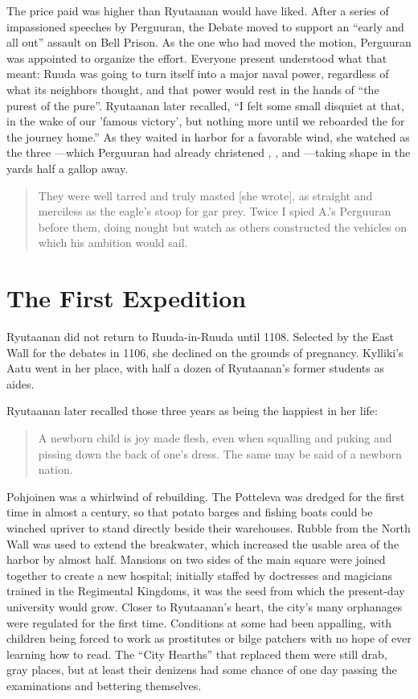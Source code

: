 \documentclass[12pt]{report}
\begin{document}
The price paid was higher than Ryutaanan would have liked.  After a
series of impassioned speeches by Perguuran, the Debate moved to
support an ``early and all out'' assault on Bell Prison.  As the one who
had moved the motion, Perguuran was appointed to organize the effort.
Everyone present understood what that meant: Ruuda was going to turn
itself into a major naval power, regardless of what its neighbors
thought, and that power would rest in the hands of ``the purest of the
pure''.  Ryutaanan later recalled, ``I felt some small disquiet at that,
in the wake of our 'famous victory', but nothing more until we
reboarded the  for the journey home.''  As they waited in
harbor for a favorable wind, she watched as the three
---which Perguuran had already christened , , and ---taking shape in the yards half a gallop away.

\begin{quotation}
They were well tarred and truly masted [she wrote], as straight and
merciless as the eagle's stoop for gar prey.  Twice I spied A.'s
Perguuran before them, doing nought but watch as others constructed
the vehicles on which his ambition would sail.
\end{quotation}

\chapter{The First Expedition}

Ryutaanan did not return to Ruuda-in-Ruuda until 1108.  Selected by
the East Wall  for the debates in 1106, she declined on
the grounds of pregnancy.  Kylliki's Aatu went in her place, with half
a dozen of Ryutaanan's former students as aides.

Ryutaanan later recalled those three years as being the happiest in
her life:

\begin{quotation}
A newborn child is joy made flesh, even when squalling and puking and
pissing down the back of one's dress.  The same may be said of a
newborn nation.
\end{quotation}

Pohjoinen was a whirlwind of rebuilding.  The Potteleva was dredged
for the first time in almost a century, so that potato barges and
fishing boats could be winched upriver to stand directly beside their
warehouses.  Rubble from the North Wall was used to extend the
breakwater, which increased the usable area of the harbor by almost
half.  Mansions on two sides of the main square were joined together
to create a new hospital; initially staffed by doctresses and
magicians trained in the Regimental Kingdoms, it was the seed from
which the present-day university would grow.  Closer to Ryutaanan's
heart, the city's many orphanages were regulated for the first time.
Conditions at some had been appalling, with children being forced to
work as prostitutes or bilge patchers with no hope of ever learning
how to read.  The ``City Hearths'' that replaced them were still drab,
gray places, but at least their denizens had some chance of one day
passing the examinations and bettering themselves.
\end{document}
